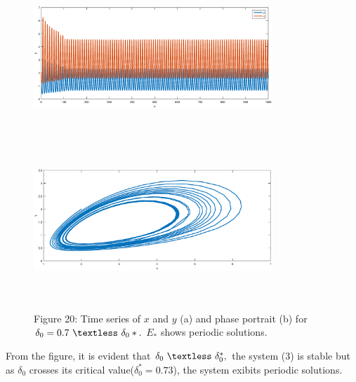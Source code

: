 \documentclass[a4paper, 10pt]{article}
\begin{document}
\begin{figure}[H]
	{\includegraphics[width=9cm, height=6cm]{26a.eps}}
	\endminipage\hfill
	{\includegraphics[width=9cm, height=6cm]{26b.eps}}
	\endminipage\hfill
	\begin{center} Figure 20: Time series of $x$ and $y$ (a) and phase portrait (b) for $\delta_0=0.7~\textless~\delta_0*.$ $E_*$ shows periodic solutions.  \end{center}
\end{figure}
From the figure, it is evident that $\delta_0~\textless~\delta_0^*,$ the system (3) is stable but as $\delta_0$ crosses its critical value($\delta_0^*=0.73$), the system exibits periodic solutions.
\end{document}
